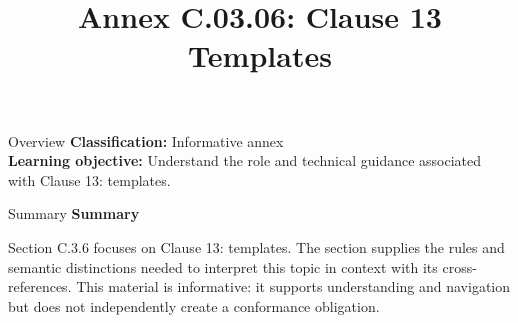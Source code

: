 \documentclass[10pt,letterpaper]{article}
\title{Annex C.03.06: Clause 13 Templates}
\author{}
\date{}
\begin{document}
\maketitle
\begin{CornellOverviewBox}{Overview}
\textbf{Classification:} Informative annex\\[2pt]
\textbf{Learning objective:} Understand the role and technical guidance associated with Clause 13: templates.
\end{CornellOverviewBox}\begin{CornellSummaryBox}{Summary}
{\sffamily\bfseries\color{Accent} Summary}\par\vspace{3pt}Section C.3.6 focuses on Clause 13: templates. The section supplies the rules and semantic distinctions needed to interpret this topic in context with its cross-references. This material is informative: it supports understanding and navigation but does not independently create a conformance obligation.
\end{CornellSummaryBox}
\end{document}
